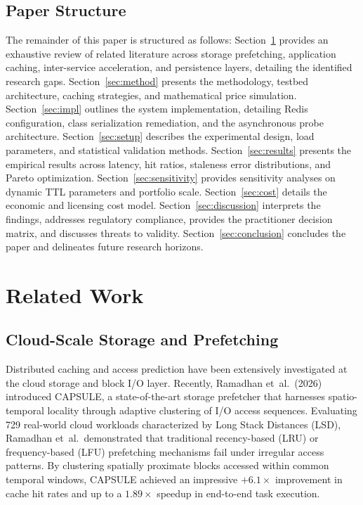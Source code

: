 \documentclass[11pt,a4paper]{article}
\begin{document}
\subsection{Paper Structure}

The remainder of this paper is structured as follows: Section~\ref{sec:related} provides an exhaustive review of related literature across storage prefetching, application caching, inter-service acceleration, and persistence layers, detailing the identified research gaps. Section~\ref{sec:method} presents the methodology, testbed architecture, caching strategies, and mathematical price simulation. Section~\ref{sec:impl} outlines the system implementation, detailing Redis configuration, class serialization remediation, and the asynchronous probe architecture. Section~\ref{sec:setup} describes the experimental design, load parameters, and statistical validation methods. Section~\ref{sec:results} presents the empirical results across latency, hit ratios, staleness error distributions, and Pareto optimization. Section~\ref{sec:sensitivity} provides sensitivity analyses on dynamic TTL parameters and portfolio scale. Section~\ref{sec:cost} details the economic and licensing cost model. Section~\ref{sec:discussion} interprets the findings, addresses regulatory compliance, provides the practitioner decision matrix, and discusses threats to validity. Section~\ref{sec:conclusion} concludes the paper and delineates future research horizons.

\section{Related Work}
\label{sec:related}

\subsection{Cloud-Scale Storage and Prefetching}

Distributed caching and access prediction have been extensively investigated at the cloud storage and block I/O layer. Recently, Ramadhan et~al.\ (2026)~\cite{capsule2026} introduced CAPSULE, a state-of-the-art storage prefetcher that harnesses spatio-temporal locality through adaptive clustering of I/O access sequences. Evaluating 729 real-world cloud workloads characterized by Long Stack Distances (LSD), Ramadhan et~al.\ demonstrated that traditional recency-based (LRU) or frequency-based (LFU) prefetching mechanisms fail under irregular access patterns. By clustering spatially proximate blocks accessed within common temporal windows, CAPSULE achieved an impressive $+6.1\times$ improvement in cache hit rates and up to a $1.89\times$ speedup in end-to-end task execution.
\end{document}
